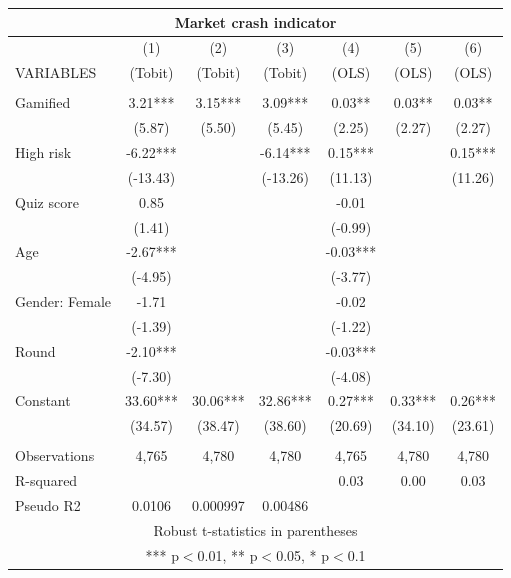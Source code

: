 \documentclass[]{article}
\begin{document}
\begin{tabular}{lcccccc}
\multicolumn{7}{c}{Market crash indicator} \\ \hline
 & (1) & (2) & (3) & (4) & (5) & (6) \\
VARIABLES & (Tobit) & (Tobit) & (Tobit) & (OLS) & (OLS) & (OLS) \\ \hline
 &  &  &  &  &  &  \\
Gamified & 3.21*** & 3.15*** & 3.09*** & 0.03** & 0.03** & 0.03** \\
 & (5.87) & (5.50) & (5.45) & (2.25) & (2.27) & (2.27) \\
High risk & -6.22*** &  & -6.14*** & 0.15*** &  & 0.15*** \\
 & (-13.43) &  & (-13.26) & (11.13) &  & (11.26) \\
Quiz score & 0.85 &  &  & -0.01 &  &  \\
 & (1.41) &  &  & (-0.99) &  &  \\
Age & -2.67*** &  &  & -0.03*** &  &  \\
 & (-4.95) &  &  & (-3.77) &  &  \\
Gender: Female & -1.71 &  &  & -0.02 &  &  \\
 & (-1.39) &  &  & (-1.22) &  &  \\
Round & -2.10*** &  &  & -0.03*** &  &  \\
 & (-7.30) &  &  & (-4.08) &  &  \\
Constant & 33.60*** & 30.06*** & 32.86*** & 0.27*** & 0.33*** & 0.26*** \\
 & (34.57) & (38.47) & (38.60) & (20.69) & (34.10) & (23.61) \\
 &  &  &  &  &  &  \\
Observations & 4,765 & 4,780 & 4,780 & 4,765 & 4,780 & 4,780 \\
R-squared &  &  &  & 0.03 & 0.00 & 0.03 \\
 Pseudo R2 & 0.0106 & 0.000997 & 0.00486 &  &  &  \\ \hline
\multicolumn{7}{c}{ Robust t-statistics in parentheses} \\
\multicolumn{7}{c}{ *** p$<$0.01, ** p$<$0.05, * p$<$0.1} \\
\end{tabular}
\end{document}
